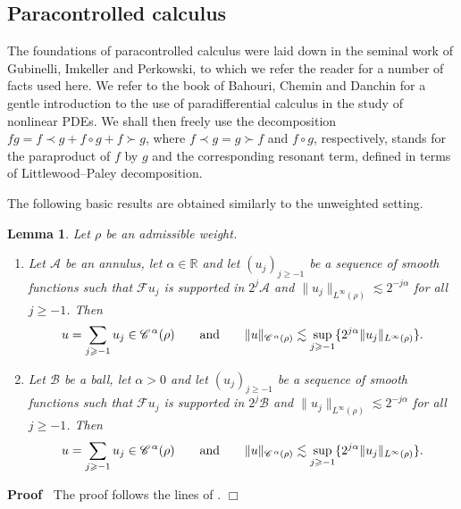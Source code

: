 \documentclass[a4paper,11pt]{article}
\renewcommand{\geq}{\geqslant}
\newenvironment{proof}{\noindent\textbf{Proof\ }}{\hspace*{\fill}$\Box$\medskip}
\newtheorem{lemma}[theorem]{Lemma}
\numberwithin{equation}{section}
\newcommand{\CC}{\mathscr{C} \hspace{.1em}}
\newcommand{\R}{\mathbb{R}}
\newcommand{\8}{\infty}
\begin{document}
\subsection{Paracontrolled calculus}
\label{ssec:para}


The foundations of paracontrolled calculus were laid down in the seminal work \cite{GIP} of Gubinelli, Imkeller and Perkowski, to which we  refer the reader for a number of facts used here. We refer to the book \cite{BCD} of Bahouri, Chemin and Danchin for a gentle introduction to the use of paradifferential calculus in the study of nonlinear PDEs. We shall then freely use the decomposition  $fg=f\prec g+f\circ g+f\succ g$, where $f\prec g=g\succ f$ and $f\circ g$, respectively, stands for the paraproduct of $f$ by $g$ and the corresponding resonant term, defined in terms of Littlewood--Paley decomposition.


The following basic results are obtained similarly to the unweighted setting.

\begin{lemma}\label{lem:bcd}
Let $\rho$ be an admissible weight.
\begin{enumerate}
\item Let $\mathcal{A}$ be an annulus, let $\alpha\in\R$ and let $(u_j)_{j\geq-1}$ be a sequence of smooth functions such that $\mathcal{F}u_j$ is supported in $2^j\mathcal{A}$ and  $\|u_j\|_{L^\infty(\rho)}\lesssim 2^{-j\alpha}$ for all $j\geq-1$. Then
$$
u=\sum_{j\geq-1}u_j\in \CC^\alpha(\rho)\qquad\text{and}\qquad\|u\|_{\CC^\alpha(\rho)}\lesssim \sup_{j\geq -1}\{2^{j\alpha}\|u_j\|_{L^\infty(\rho)}\}.
$$
\item Let $\mathcal{B}$ be a ball, let $\alpha>0$ and let $(u_j)_{j\geq-1}$ be a sequence of smooth functions such that $\mathcal{F}u_j$ is supported in $2^j\mathcal{B}$ and  $\|u_j\|_{L^\infty(\rho)}\lesssim 2^{-j\alpha}$ for all $j\geq-1$. Then
$$
u=\sum_{j\geq-1}u_j\in \CC^\alpha(\rho)\qquad\text{and}\qquad\|u\|_{\CC^\alpha(\rho)}\lesssim \sup_{j\geq -1}\{2^{j\alpha}\|u_j\|_{L^\infty(\rho)}\}.
$$
\end{enumerate}
\end{lemma}

\begin{proof}
The proof follows the lines of \cite[Lemma A.3]{GIP}.
\end{proof}
\end{document}
